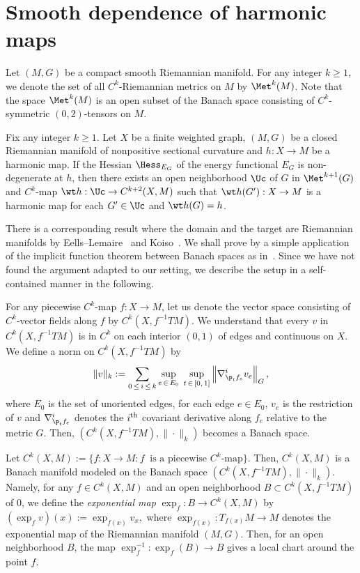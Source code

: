 \section{Smooth dependence of harmonic maps}\label{AppB}

Let $(M,G)$ be a compact smooth Riemannian manifold. For any integer $k\geq 1$, we denote the set of all $C^k$-Riemannian metrics on $M$ by $\Met^k(M)$. Note that the space $\Met^k(M)$ is an open subset of the Banach space consisting of $C^k$-symmetric $(0,2)$-tensors on $M$.

\begin{prop}\label{smooth dependence}
Fix any integer $k \ge 1$. Let $X$ be a finite weighted graph, $(M, G)$ be a closed Riemannian manifold of nonpositive sectional curvature and $h: X\to M$ be a harmonic map. If the Hessian $\Hess_{E_G}$ of the energy functional $E_G$ is non-degenerate at $h$, then there exists an open neighborhood $\Uc$ of $G$ in $\Met^{k+1}(G)$ and $C^k$-map $\wt h:\Uc \to C^{k+2}(X, M)$ such that $\wt h(G'):X \to M$ is a harmonic map for each $G' \in \Uc$ and $\wt h(G)=h$.
\end{prop}

There is a corresponding result where the domain and the target are Riemannian manifolds by Eells--Lemaire~\cite[Theorem~3.1]{EL} and Koiso~\cite[Theorem~4.7]{Koiso}. We shall prove by a simple application of the implicit function theorem between Banach spaces as in~\cite{EL}. Since we have not found the argument adapted to our setting, we describe the setup in a self-contained manner in the following.



For any piecewise $C^k$-map $f:X \to M$, let us denote the vector space consisting of $C^k$-vector fields along $f$ by $C^k(X, f^{-1}TM)$. We understand that every $v$ in $C^k(X, f^{-1}TM)$ is in $C^k$ on each interior $(0, 1)$ of edges and continuous on $X$. We define a norm on $C^k(X, f^{-1}TM)$ by
\[
\|v\|_k:=\sum_{0\,\leq\,i\,\leq\,k}\underset{e\,\in\,E_0}\sup\;\sup_{t\,\in\,[0,\, 1]}\left\|\nabla^i_{\p_t f_e} v_e\right\|_{G},
\]
where $E_0$ is the set of unoriented edges, for each edge $e\in E_0$, $v_e$ is the restriction of $v$ and $\nabla^i_{\p_t f_e}$ denotes the $i^{\rm th}$ covariant derivative along $f_e$ relative to the metric $G$. Then, $(C^k(X, f^{-1}TM), \|\cdot\|_k)$ becomes a Banach space.


Let $C^k(X, M):=\{f:X\to M: f\ \text{ is a piecewise $C^k$-map}\}$. Then, $C^k(X, M)$ is a Banach manifold modeled on the Banach space $(C^k(X, f^{-1}TM), \|\cdot \|_k)$. Namely, for any $f\in C^k(X, M)$ and an open neighborhood $B\subset C^k(X, f^{-1}TM)$ of $0$, we define the \emph{exponential map} ${\exp}_f:B\to C^k(X,M)$ by $ (\exp_fv)(x):=\exp_{f(x)}v_{x}, $ where $\exp_{f(x)}: T_{f(x)}M\to M$ denotes the exponential map of the Riemannian manifold $(M,G)$. Then, for an open neighborhood $B$, the map $\exp_f^{-1}: \exp_f(B)\to B$ gives a local chart around the point $f$.



